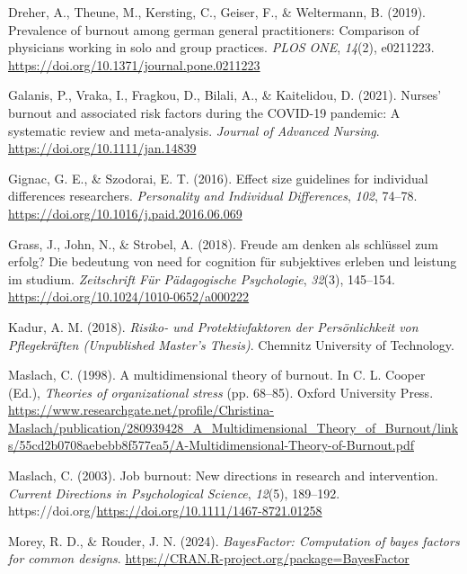 \documentclass[
  man]{apa6}
\newlength{\cslhangindent}
\newenvironment{CSLReferences}[2] %
 {\begin{list}{}{%
  \setlength{\itemindent}{0pt}
  \setlength{\leftmargin}{0pt}
  \setlength{\parsep}{0pt}
  \ifodd #1
   \setlength{\leftmargin}{\cslhangindent}
   \setlength{\itemindent}{-1\cslhangindent}
  \fi
  \setlength{\itemsep}{#2\baselineskip}}}
 {\end{list}}
\begin{document}
\begin{CSLReferences}{1}{0}
Dreher, A., Theune, M., Kersting, C., Geiser, F., \& Weltermann, B. (2019). Prevalence of burnout among german general practitioners: Comparison of physicians working in solo and group practices. \emph{PLOS ONE}, \emph{14}(2), e0211223. \url{https://doi.org/10.1371/journal.pone.0211223}

Galanis, P., Vraka, I., Fragkou, D., Bilali, A., \& Kaitelidou, D. (2021). Nurses' burnout and associated risk factors during the COVID-19 pandemic: A systematic review and meta-analysis. \emph{Journal of Advanced Nursing}. \url{https://doi.org/10.1111/jan.14839}

Gignac, G. E., \& Szodorai, E. T. (2016). Effect size guidelines for individual differences researchers. \emph{Personality and Individual Differences}, \emph{102}, 74--78. \url{https://doi.org/10.1016/j.paid.2016.06.069}

Grass, J., John, N., \& Strobel, A. (2018). Freude am denken als schlüssel zum erfolg? Die bedeutung von need for cognition für subjektives erleben und leistung im studium. \emph{Zeitschrift Für Pädagogische Psychologie}, \emph{32}(3), 145--154. \url{https://doi.org/10.1024/1010-0652/a000222}

Kadur, A. M. (2018). \emph{{Risiko}- und {Protektivfaktoren} der {Persönlichkeit} von {Pflegekräften} ({Unpublished Master's Thesis})}. Chemnitz University of Technology.

Maslach, C. (1998). A multidimensional theory of burnout. In C. L. Cooper (Ed.), \emph{Theories of organizational stress} (pp. 68--85). Oxford University Press. \url{https://www.researchgate.net/profile/Christina-Maslach/publication/280939428_A_Multidimensional_Theory_of_Burnout/links/55cd2b0708aebebb8f577ea5/A-Multidimensional-Theory-of-Burnout.pdf}

Maslach, C. (2003). Job burnout: New directions in research and intervention. \emph{Current Directions in Psychological Science}, \emph{12}(5), 189--192. https://doi.org/\url{https://doi.org/10.1111/1467-8721.01258}

Morey, R. D., \& Rouder, J. N. (2024). \emph{BayesFactor: Computation of bayes factors for common designs}. \url{https://CRAN.R-project.org/package=BayesFactor}


\end{CSLReferences}
\end{document}
